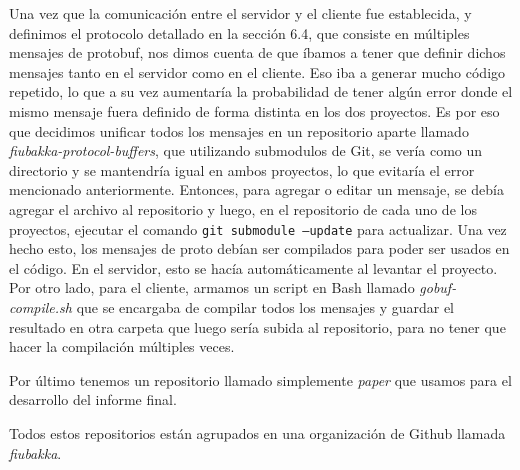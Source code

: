 Una vez que la comunicación entre el servidor y el cliente fue establecida, y definimos el protocolo detallado en la sección 6.4, que consiste en
múltiples mensajes de protobuf, nos dimos cuenta de que íbamos a tener que definir dichos mensajes tanto en el servidor como en el cliente. Eso iba
a generar mucho código repetido, lo que a su vez aumentaría la probabilidad de tener algún error donde el mismo mensaje fuera definido de
forma distinta en los dos proyectos. Es por eso que decidimos unificar todos los mensajes en un repositorio aparte llamado \textit{fiubakka-protocol-buffers}, que utilizando submodulos
de Git, se vería como un directorio y se mantendría igual en ambos proyectos, lo que evitaría el error mencionado anteriormente.
Entonces, para agregar o editar un mensaje, se debía agregar el archivo al repositorio y luego, en el repositorio de cada uno de los proyectos, 
ejecutar el comando \texttt{git submodule --update} para actualizar. Una vez hecho esto, los mensajes de proto debían ser compilados para poder
ser usados en el código. En el servidor, esto se hacía automáticamente al levantar el proyecto. Por otro lado, para el cliente, armamos un
script en Bash llamado \textit{gobuf-compile.sh} que se encargaba de compilar todos los mensajes y guardar el resultado en otra carpeta que 
luego sería subida al repositorio, para no tener que hacer la compilación múltiples veces.

Por último tenemos un repositorio llamado simplemente \textit{paper} que usamos para el desarrollo del informe final.

Todos estos repositorios están agrupados en una organización de Github llamada \textit{fiubakka}.
